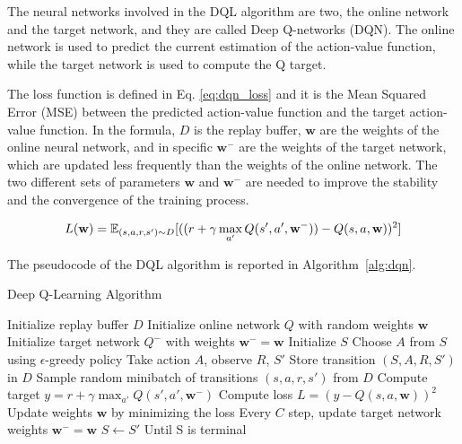 The neural networks involved in the DQL algorithm are two, the online network and the target network, and they are called Deep Q-networks (DQN).
The online network is used to predict the current estimation of the action-value function, while the target network is used to compute the Q target.

The loss function is defined in Eq. \ref{eq:dqn_loss} and it is the Mean Squared Error (MSE) between the predicted action-value function and the target action-value function.
In the formula, $D$ is the replay buffer, $\textbf{w}$ are the weights of the online neural network, and in specific $\textbf{w}^-$ are the weights of the target network, which are updated less frequently than the weights of the online network.
The two different sets of parameters $\textbf{w}$ and $\textbf{w}^-$ are needed to improve the stability and the convergence of the training process.

\begin{equation} \label{eq:dqn_loss}
    L(\textbf{w}) = \operatorname{\mathbb{E}}_{(s, a, r, s') \sim D} [((r + \gamma \max_{a'} Q(s', a', \textbf{w}^-)) - Q(s, a, \textbf{w}))^2]
\end{equation}

The pseudocode of the DQL algorithm is reported in Algorithm~\ref{alg:dqn}.

\begin{algorithm}
\caption{Deep Q-Learning Algorithm}\label{alg:dqn}
\begin{algorithmic}
\State Initialize replay buffer $D$
\State Initialize online network $Q$ with random weights $\textbf{w}$
\State Initialize target network $Q^-$ with weights $\textbf{w}^- = \textbf{w}$
    \State Initialize $S$
        \State Choose $A$ from $S$ using $\epsilon$-greedy policy
        \State Take action $A$, observe $R$, $S'$
        \State Store transition $(S, A, R, S')$ in $D$
        \State Sample random minibatch of transitions $(s, a, r, s')$ from $D$
        \State Compute target $y = r + \gamma \max_{a'} Q(s', a', \textbf{w}^-)$
        \State Compute loss $L = (y - Q(s, a, \textbf{w}))^2$
        \State Update weights $\textbf{w}$ by minimizing the loss
        \State Every $C$ step, update target network weights $\textbf{w}^- = \textbf{w}$
        \State $S \leftarrow S'$
    \EndFor
\State Until S is terminal
\EndFor
\end{algorithmic}
\end{algorithm}





